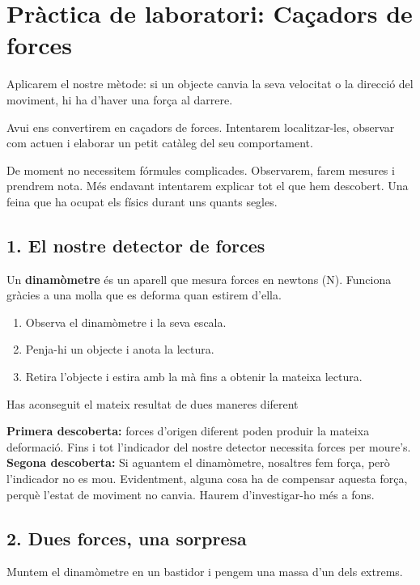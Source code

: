 
\section{Pràctica de laboratori: Caçadors de forces}

Aplicarem el nostre mètode: si un objecte canvia la seva velocitat o la direcció del moviment, hi ha d'haver una força al darrere.

Avui ens convertirem en caçadors de forces. Intentarem localitzar-les, observar com actuen i elaborar un petit catàleg del seu comportament.

De moment no necessitem fórmules complicades. Observarem, farem mesures i prendrem nota. Més endavant intentarem explicar tot el que hem descobert. Una feina que ha ocupat els físics durant uns quants segles.

\subsection{1. El nostre detector de forces}

Un \textbf{dinamòmetre} és un aparell que mesura forces en newtons (N). Funciona gràcies a una molla que es deforma quan estirem d'ella.

\begin{enumerate}
    \item Observa el dinamòmetre i la seva escala.
    \item Penja-hi un objecte i anota la lectura.
    \item Retira l'objecte i estira amb la mà fins a obtenir la mateixa lectura.
\end{enumerate}

Has aconseguit el mateix resultat de dues maneres diferent

\textbf{Primera descoberta:} forces d'origen diferent poden produir la mateixa deformació. Fins i tot l'indicador del nostre detector necessita forces per moure's.
\textbf{Segona descoberta:} Si aguantem el dinamòmetre, nosaltres fem força, però l'indicador no es mou. Evidentment, alguna cosa ha de compensar aquesta força, perquè l'estat de moviment no canvia. Haurem d'investigar-ho més a fons.


\subsection{2. Dues forces, una sorpresa}

Muntem el dinamòmetre en un bastidor i pengem una massa d'un dels extrems.

